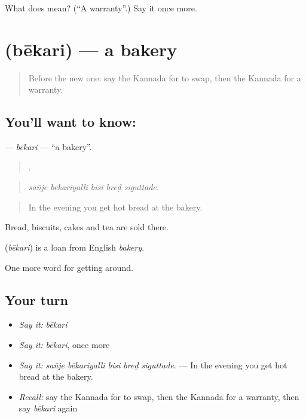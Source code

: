 \begin{tcolorbox}[breakable,colback=teal!4,colframe=teal!35!black,title={Before you move on}]
What does  mean? (\textquotedblleft{}A warranty\textquotedblright{}.) Say it once more.
\end{tcolorbox}
\section[\texorpdfstring{\kn{ಬೇಕರಿ} (bēkari)}{ಬೇಕರಿ (bēkari)}]{ (bēkari) — a bakery}

\label{lesson:KA-C469-bekari}



\begin{quote}
Before the new one: say the Kannada for to swap, then the Kannada for a warranty.
\end{quote}

\subsection*{You'll want to know: }
\textbf{} — \emph{bēkari} — \textquotedblleft{}a bakery\textquotedblright{}.

\begin{quote}
    .
\end{quote}

\begin{quote}
\emph{sañje bēkariyalli bisi breḍ siguttade.}
\end{quote}

\begin{quote}
In the evening you get hot bread at the bakery.
\end{quote}

Bread, biscuits, cakes and tea are sold there.

\begin{cousinweb}
\textbf{} (\emph{bēkari}) is a loan from English \emph{bakery}.
\end{cousinweb}

\begin{grammarlens}[title={What you've built}]
One more word for getting around.
\end{grammarlens}

\subsection*{Your turn}
\begin{itemize}
\raggedright
  \item \emph{Say it:} \emph{bēkari}
  \item \emph{Say it:} \emph{bēkari}, once more
  \item \emph{Say it:} \emph{sañje bēkariyalli bisi breḍ siguttade.} — In the evening you get hot bread at the bakery.
  \item \emph{Recall:} say the Kannada for to swap, then the Kannada for a warranty, then say \emph{bēkari} again
\end{itemize}

